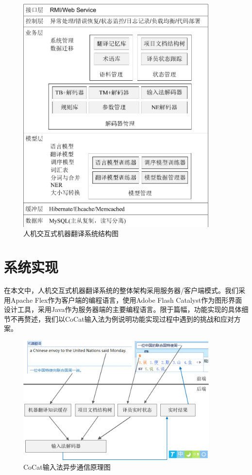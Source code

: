 \begin{figure}[!tb]
	\centering
	\includegraphics[width=0.9\textwidth]{Figure/Figure_6_1.pdf}
	\caption{人机交互式机器翻译系统结构图}
	\label{Fig_system_overview}
\end{figure}

\section{系统实现}

在本文中，人机交互式机器翻译系统的整体架构采用服务器/客户端模式。我们采用Apache Flex作为客户端的编程语言，使用Adobe Flash Catalyst作为图形界面设计工具，采用Java作为服务器端的主要编程语言。限于篇幅，功能实现的具体细节不再赘述，我们以CoCat输入法为例说明功能实现过程中遇到的挑战和应对方案。

\begin{figure}[!tb]
	\centering
	\includegraphics[width=0.9\textwidth]{Figure/Figure_6_2.pdf}
	\caption{CoCat输入法异步通信原理图}
	\label{Fig_system_communication}
\end{figure}

